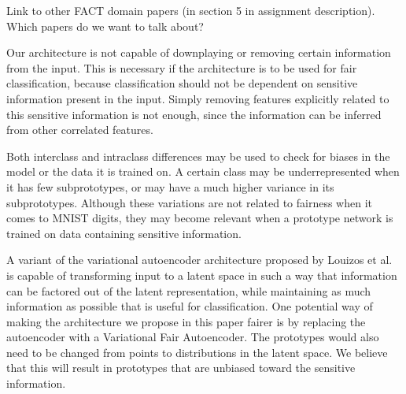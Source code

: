 Link to other FACT domain papers (in section 5 in assignment description). Which papers do we want to talk about?

Our architecture is not capable of downplaying or removing certain
information from the input. This is necessary if the architecture is to be used for fair classification, because classification should not be dependent on sensitive information present in the input. Simply removing features explicitly related to this sensitive information is not enough, since the information can be inferred from other correlated features.

Both interclass and intraclass differences may be used to check for biases in the model or the data it is trained on. A certain class may be underrepresented when it has few subprototypes, or may have a much higher variance in its subprototypes. Although these variations are not related to fairness when it comes to MNIST digits, they may become relevant when a prototype network is trained on data containing sensitive information.

A variant of the variational autoencoder architecture \citep{vae} proposed by Louizos et al. \citep{vfae} is capable of transforming input to a latent space in such a way that information can be factored out of the latent representation, while maintaining as much information as possible that is useful for classification. One potential way of making the architecture we propose in this paper fairer is by replacing the autoencoder with a Variational Fair Autoencoder. The prototypes would also need to be changed from points to distributions in the latent space. We believe that this will result in prototypes that are unbiased toward the sensitive information.

